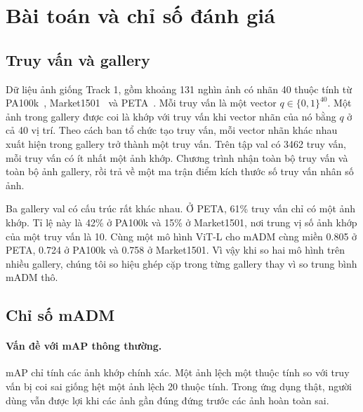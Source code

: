\documentclass[11pt,a4paper]{article}
\begin{document}
\section{Bài toán và chỉ số đánh giá}
\label{sec:task}

\subsection{Truy vấn và gallery}

Dữ liệu ảnh giống Track 1, gồm khoảng 131 nghìn ảnh có nhãn 40 thuộc tính từ PA100k~\cite{pa100k}, Market1501~\cite{market} và PETA~\cite{peta}. Mỗi truy vấn là một vector $q\in\{0,1\}^{40}$. Một ảnh trong gallery được coi là khớp với truy vấn khi vector nhãn của nó bằng $q$ ở cả 40 vị trí. Theo cách ban tổ chức tạo truy vấn, mỗi vector nhãn khác nhau xuất hiện trong gallery trở thành một truy vấn. Trên tập val có 3462 truy vấn, mỗi truy vấn có ít nhất một ảnh khớp. Chương trình nhận toàn bộ truy vấn và toàn bộ ảnh gallery, rồi trả về một ma trận điểm kích thước số truy vấn nhân số ảnh.

Ba gallery val có cấu trúc rất khác nhau. Ở PETA, 61\% truy vấn chỉ có một ảnh khớp. Tỉ lệ này là 42\% ở PA100k và 15\% ở Market1501, nơi trung vị số ảnh khớp của một truy vấn là 10. Cùng một mô hình ViT-L cho mADM cùng miền 0.805 ở PETA, 0.724 ở PA100k và 0.758 ở Market1501. Vì vậy khi so hai mô hình trên nhiều gallery, chúng tôi so hiệu ghép cặp trong từng gallery thay vì so trung bình mADM thô.

\subsection{Chỉ số mADM}
\label{sec:metric}

\paragraph{Vấn đề với mAP thông thường.} mAP chỉ tính các ảnh khớp chính xác. Một ảnh lệch một thuộc tính so với truy vấn bị coi sai giống hệt một ảnh lệch 20 thuộc tính. Trong ứng dụng thật, người dùng vẫn được lợi khi các ảnh gần đúng đứng trước các ảnh hoàn toàn sai.
\end{document}
